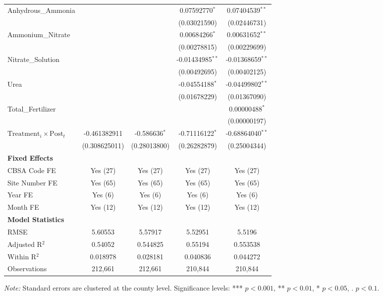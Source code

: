 \documentclass[12pt]{article}
\begin{document}
\begin{table}[h]
\begin{threeparttable}
\begin{adjustbox}{max width=\textwidth}
\begin{tabular}{l c c c c}
					Anhydrous\_Ammonia &  &  & 0.07592770$^{*}$ & 0.07404539$^{**}$ \\  
					&  &  & {\footnotesize (0.03021590)} & {\footnotesize (0.02446731)} \\
					Ammonium\_Nitrate &  &  & 0.00684266$^{*}$ & 0.00631652$^{**}$ \\  
					&  &  & {\footnotesize (0.00278815)} & {\footnotesize (0.00229699)} \\
					Nitrate\_Solution &  &  & -0.01434985$^{**}$ & -0.01368659$^{**}$ \\  
					&  &  & {\footnotesize (0.00492695)} & {\footnotesize (0.00402125)} \\
					Urea &  &  & -0.04554188$^{*}$ & -0.04499802$^{**}$ \\  
					&  &  & {\footnotesize (0.01678229)} & {\footnotesize (0.01367090)} \\
					Total\_Fertilizer &  &  &  & 0.00000488$^{*}$ \\ 
					&  &  &  & {\footnotesize (0.00000197)} \\
					$\text{Treatment}_{i} \times \text{Post}_{t}$ & -0.461382911 & -0.586636$^{*}$ & -0.71116122$^{*}$ & -0.68864040$^{**}$ \\
					& {\footnotesize (0.308625011)} & {\footnotesize (0.28013800)} & {\footnotesize (0.26282879)} & {\footnotesize (0.25004344)} \\
					\midrule
					\textbf{Fixed Effects} & & & & \\
					CBSA Code FE & Yes (27) & Yes (27) & Yes (27) & Yes (27) \\
					Site Number FE & Yes (65) & Yes (65) & Yes (65) & Yes (65) \\
					Year FE & Yes (6) & Yes (6) & Yes (6) & Yes (6) \\
					Month FE & Yes (12) & Yes (12) & Yes (12) & Yes (12) \\
					\midrule
					\textbf{Model Statistics} & & & & \\
					RMSE & 5.60553 & 5.57917 & 5.52951 & 5.5196 \\
					Adjusted R$^2$ & 0.54052 & 0.544825 & 0.55194 & 0.553538 \\
					Within R$^2$ & 0.018978 & 0.028181 & 0.040836 & 0.044272 \\
					Observations & 212,661 & 212,661 & 210,844 & 210,844 \\
					\bottomrule
					\bottomrule
					
				\end{tabular}
			\end{adjustbox}
			\begin{tablenotes}
				\item \textit{Note:} Standard errors are clustered at the county level. Significance levels: *** $p<0.001$, ** $p<0.01$, * $p<0.05$, . $p<0.1$. 
			\end{tablenotes}
		\end{threeparttable}
	\end{table}
	
\end{document}
